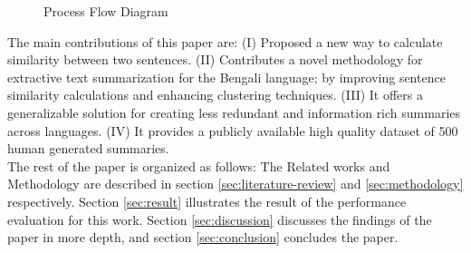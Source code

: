 \begin{figure}
    \centering
    
    \caption{Process Flow Diagram}
    \label{fig:process-flow-diagram}
\end{figure}
The main contributions of this paper are:
(I) Proposed a new way to calculate similarity between two sentences.
(II) Contributes a novel methodology for extractive text summarization for the Bengali language; by improving sentence similarity calculations and enhancing clustering techniques.
(III) It offers a generalizable solution for creating less redundant and information rich summaries across languages.
(IV) It provides a publicly available high quality dataset of 500 human generated summaries.\\

The rest of the paper is organized as follows: The Related works and Methodology are described in section \ref{sec:literature-review} and \ref{sec:methodology} respectively. Section \ref{sec:result} illustrates the result of the performance evaluation for this work. Section \ref{sec:discussion} discusses the findings of the paper in more depth, and section \ref{sec:conclusion} concludes the paper.